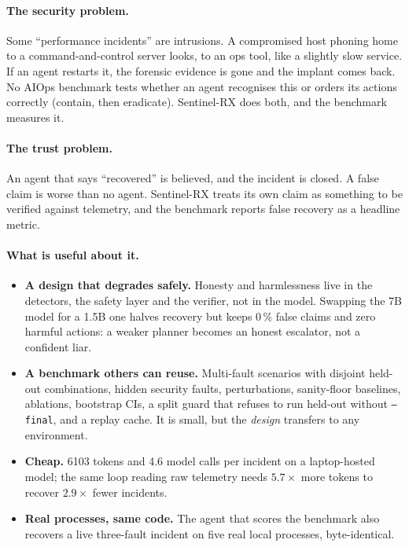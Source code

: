 \documentclass[11pt,a4paper]{article}
\newcommand{\code}[1]{\texttt{#1}}
\newcommand{\pct}[1]{#1\,\%}
\begin{document}
\paragraph{The security problem.} Some ``performance incidents'' are intrusions. A compromised host
phoning home to a command-and-control server looks, to an ops tool, like a slightly slow service.
If an agent restarts it, the forensic evidence is gone and the implant comes back. No AIOps
benchmark tests whether an agent recognises this or orders its actions correctly (contain, then
eradicate). Sentinel-RX does both, and the benchmark measures it.

\paragraph{The trust problem.} An agent that says ``recovered'' is believed, and the incident is
closed. A false claim is worse than no agent. Sentinel-RX treats its own claim as something to be
verified against telemetry, and the benchmark reports false recovery as a headline metric.

\paragraph{What is useful about it.}
\begin{itemize}
  \item \textbf{A design that degrades safely.} Honesty and harmlessness live in the detectors,
        the safety layer and the verifier, not in the model. Swapping the 7B model for a 1.5B one
        halves recovery but keeps \pct{0} false claims and zero harmful actions: a weaker planner
        becomes an honest escalator, not a confident liar.
  \item \textbf{A benchmark others can reuse.} Multi-fault scenarios with disjoint held-out
        combinations, hidden security faults, perturbations, sanity-floor baselines, ablations,
        bootstrap CIs, a split guard that refuses to run held-out without \code{--final}, and a replay
        cache. It is small, but the \emph{design} transfers to any environment.
  \item \textbf{Cheap.} \num{6103} tokens and 4.6 model calls per incident on a laptop-hosted
        model; the same loop reading raw telemetry needs $5.7\times$ more tokens to recover
        $2.9\times$ fewer incidents.
  \item \textbf{Real processes, same code.} The agent that scores the benchmark also recovers a
        live three-fault incident on five real local processes, byte-identical.
\end{itemize}
\end{document}
